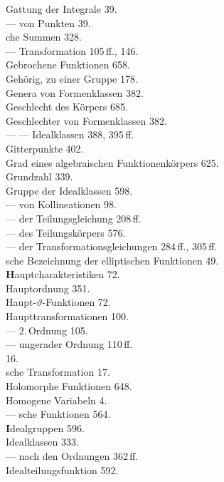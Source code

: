 \begin{minipage}[t]{0.48\textwidth}
\noindent
Gattung der Integrale 39. \\
--- von Punkten 39. \\
che Summen 328. \\
--- Transformation 105\,ff., 146. \\
Gebrochene Funktionen 658. \\
Gehörig, zu einer Gruppe 178. \\
Genera von Formenklassen 382. \\
Geschlecht des Körpers 685. \\
Geschlechter von Formenklassen 382. \\
--- --- Idealklassen 388, 395\,ff. \\
Gitterpunkte 402. \\
Grad eines algebraischen Funktionenkörpers 625. \\
Grundzahl 339. \\
Gruppe der Idealklassen 598. \\
--- von Kollineationen 98. \\
--- der Teilungsgleichung 208\,ff. \\
--- des Teilungskörpers 576. \\
--- der Transformationsgleichungen 284\,ff., 305\,ff. \\
sche Bezeichnung der elliptischen Funktionen 49. \\[4pt]
\textbf{H}auptcharakteristiken 72. \\
Hauptordnung 351. \\
Haupt-$\vartheta$-Funktionen 72. \\
Haupttransformationen 100. \\
--- 2.\,Ordnung 105. \\
--- ungerader Ordnung 110\,ff. \\
 16. \\
sche Transformation 17. \\
Holomorphe Funktionen 648. \\
Homogene Variabeln 4. \\
--- sche Funktionen 564. \\[4pt]
\textbf{I}dealgruppen 596. \\
Idealklassen 333. \\
--- nach den Ordnungen 362\,ff. \\
Idealteilungsfunktion 592. \\

\end{minipage}
